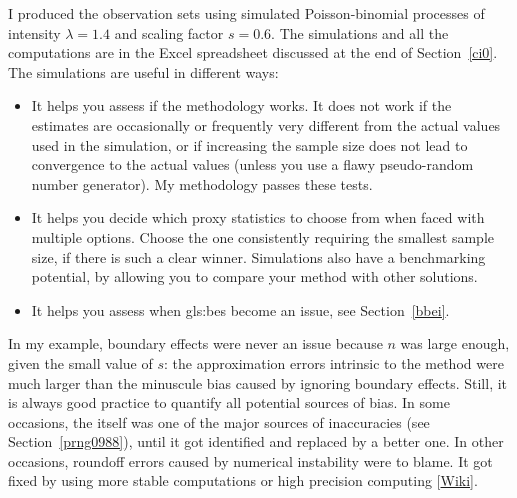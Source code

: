 \documentclass[10pt]{article}
\begin{document}
\noindent I produced the observation sets using simulated Poisson-binomial processes of intensity $\lambda=1.4$ and scaling factor $s=0.6$. The simulations and all the computations are in the Excel spreadsheet discussed at the end of Section~\ref{ci0}. The \textcolor{index}{simulations} are useful in different ways: 
\begin{itemize}
\item It helps you assess if the methodology works. It does not work if the estimates are occasionally or frequently very different from the actual values used in the simulation, or if increasing the sample size does not lead to convergence to the actual values (unless you use a flawy pseudo-random number generator). My methodology passes these tests.
\item It helps you decide which proxy statistics to choose from when faced with multiple options. Choose the one consistently requiring the smallest sample size, if there is
such a clear winner. Simulations also have a benchmarking potential, by allowing you to compare your method with other solutions.
\item It helps you assess when \glspl{gls:be} become an issue, see Section~\ref{bbei}. 
\end{itemize}
In my example, boundary effects were never an issue because
$n$ was large enough, given the small value of $s$: the approximation errors intrinsic to the method were much larger than the minuscule bias caused by ignoring  boundary effects.  Still, it is always good practice to quantify all potential sources of bias. In some occasions, the
 itself was one of the major sources of inaccuracies 
(see Section~\ref{prng0988}), until it got identified and replaced by a better one. In other
occasions, roundoff errors caused by \textcolor{index}{numerical instability} were to blame. It got fixed by using more 
stable computations or \textcolor{index}{high precision computing} [\href{https://en.wikipedia.org/wiki/Arbitrary-precision_arithmetic}{Wiki}]. 
\quad \\ 

\end{document}
